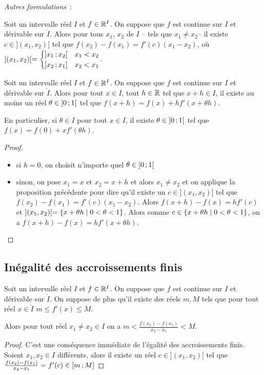 \emph{Autres formulations}~:

\begin{prop}
  Soit un intervalle réel \(I\) et \(f \in \mathbb{R}^I\). On suppose que \(f\) est continue sur \(I\) et dérivable sur \(\mathring{I}\). Alors pour tous \(x_1\), \(x_2\) de \(I\) -- tels que \(x_1 \neq x_2\)-- il existe \(c \in ](x_1,x_2)[\) tel que \(f(x_2)-f(x_1)=f'(c)(x_1-x_2)\), où \( ](x_1,x_2)[ = \begin{cases} \left] x_1 \, ;  x_2 \right[ & x_1 < x_2 \\ \left[ x_2 \, ;  x_1 \right] & x_2 < x_1 \end{cases}\).
\end{prop}
\begin{prop}
  Soit un intervalle réel \(I\) et \(f \in \mathbb{R}^I\). On suppose que \(f\) est continue sur \(I\) et dérivable sur \(\mathring{I}\). Alors pour tout \(x \in I\), tout \(h \in \mathbb{R}\) tel que \(x+h \in I\), il existe au moins un réel \(\theta \in \left] 0 \, ;  1 \right[\) tel que \(f(x+h)=f(x)+hf'(x+\theta h)\). 

En particulier, si \(\theta \in I\) pour tout \(x \in I\), il existe \(\theta \in \left] 0 \, ;  1 \right[\) tel que \(f(x)=f(0)+xf'(\theta h)\).
\end{prop}
\begin{proof}
  \begin{itemize}
  \item si \(h=0\), on choisit n'importe quel \(\theta \in \left] 0 \, ;  1 \right[\)
  \item sinon, on pose \(x_1=x\) et \(x_2=x+h\) et alors \(x_1 \neq x_2\) et on applique la proposition précédente pour dire qu'il existe un \(c \in ](x_1,x_2)[\) tel que \(f(x_2)-f(x_1)=f'(c)(x_1-x_2)\). Alors \(f(x+h)-f(x)=hf'(c)\) et \(](x_1,x_2)[ = \left\{x+\theta h\mathrel{}\middle|\mathrel{}0 < \theta < 1\right\}\). Alors comme \(c \in \left\{x+\theta h\mathrel{}\middle|\mathrel{}0 < \theta < 1\right\}\), on a \(f(x+h)-f(x)=hf'(x + \theta h)\).
  \end{itemize}
\end{proof}

\subsection{Inégalité des accroissements finis}

\begin{theo}[IAF]\label{theo:iaf}
  Soit un intervalle réel \(I\) et \(f \in \mathbb{R}^I\). On suppose que \(f\) est continue sur \(I\) et dérivable sur \(\mathring{I}\). On suppose de plus qu'il existe des réels \(m,M\) tels que pour tout réel \(x \in \mathring{I}\) \(m \leqslant f'(x) \leqslant M\).

Alors pour tout réel \(x_1 \neq x_2 \in I\) on a \(m < \frac{f(x_2)-f(x_1)}{x_2-x_1} < M\).
\end{theo}
\begin{proof}
  C'est une conséquence immédiate de l'égalité des accroissements finis. Soient \(x_1, x_2 \in I\) différents, alors il existe un réel \(c \in ](x_1,x_2)[\) tel que \(\frac{f(x_2)-f(x_1)}{x_2-x_1} = f'(c) \in \left[ m \, ;  M \right]\)
\end{proof}

